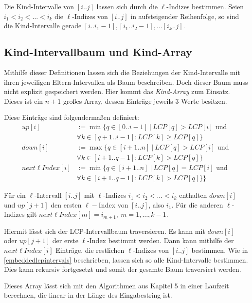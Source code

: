 Die Kind-Intervalle von $[i..j]$ lassen sich durch die $\ell$-Indizes bestimmen. Seien $i_1 < i_2 < \dots < i_k$ die $\ell$-Indizes von $[i..j]$ in aufsteigender Reihenfolge, so sind die 
Kind-Intervalle gerade $[i.. i_1 - 1], [i_1.. i_2 - 1], \dots [i_k..j]$.

\subsection{Kind-Intervallbaum und Kind-Array}
\label{childtree}

Mithilfe dieser Definitionen lassen sich die Beziehungen der Kind-Intervalle mit ihren jeweiligen Eltern-Intervallen als Baum beschreiben.
Doch dieser Baum muss nicht explizit gespeichert werden. Hier kommt das \emph{Kind-Array} zum Einsatz. Dieses ist ein $n + 1$ großes Array, dessen Einträge jeweils 3 Werte besitzen.

Diese Einträge sind folgendermaßen definiert:
\begin{align*}
	up[i] &:= \min\{q \in [0..i-1] \ |\ LCP[q] > LCP[i] \text{ und }\\ 
    &\forall k \in [q + 1..i - 1] : LCP[k] \geq LCP[q]\}\\
	down[i] &:= \max\{q \in [i+1..n] \ |\ LCP[q] > LCP[i] \text{ und }\\
    &\forall k \in [i + 1 .. q - 1] : LCP[k] > LCP[q]\}\\
	next \ell Index[i] &:= \min\{q \in [i+1..n] \ |\ LCP[q] = LCP[i] \text{ und }\\
    &\forall k \in [i + 1 .. q - 1] : LCP[k] > LCP[q]\}\}
\end{align*}

Für ein $\ell$-Intervall $[i..j]$ mit $\ell$-Indizes $i_1 < i_2 < \dots < i_k$ enthalten $down[i]$ und $up[j+1]$ den ersten $\ell-$Index von $[i..j]$, also $i_1$. Für die anderen $\ell$-Indizes gilt $next \ell Index[m] = i_{m+1},\ m=1,\dots,k-1$.

Hiermit lässt sich der LCP-Intervallbaum traversieren. Es kann mit $down[i]$ oder $up[j+1]$ der erste $\ell$-Index bestimmt werden. Dann kann mithilfe der $next \ell Index[i]$ Einträge, die restlichen $\ell$-Indizes von $[i..j]$ bestimmen. Wie in \autoref{embeddedlcpintervals} beschrieben, lassen sich so alle Kind-Intervalle bestimmen. Dies kann rekursiv fortgesetzt und somit der gesamte Baum traversiert werden.

Dieses Array lässt sich mit den Algorithmen aus \cite{abouelhoda_optimal_2002} Kapitel 5 in einer Laufzeit berechnen, die linear in der Länge des Eingabestring ist.

